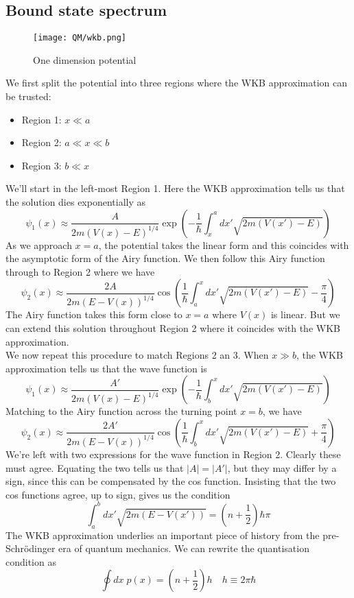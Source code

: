 \subsection{Bound state spectrum}
\begin{figure}[!h]
	\centering
	\texttt{[image: QM/wkb.png]}
	\caption{One dimension potential}
\end{figure}
\noindent
We first split the potential into three regions where the WKB approximation can be trusted:
\begin{itemize}
\item Region 1: $x \ll a$
\item Region 2: $a \ll x \ll b$
\item Region 3: $b \ll x$
\end{itemize}
We'll start in the left-most Region 1. Here the WKB
approximation tells us that the solution dies exponentially as
\[\psi_1(x) \approx \frac{A}{2m(V(x) - E)^{1/4}} \exp \left( -\frac{1}{\hbar} \int_{x}^a dx' \sqrt{2m(V(x')-E)} \right)\]
As we approach $x = a$, the potential takes the linear form and this coincides with the asymptotic form of the Airy function. We then follow this Airy function through to Region 2 where we have
\[\psi_2(x) \approx \frac{2A}{2m(E - V(x))^{1/4}} \cos \left( \frac{1}{\hbar} \int_{a}^x dx' \sqrt{2m(V(x')-E)} - \frac{\pi}{4} \right)\]
The Airy function takes this form close to $x = a$ where $V(x)$ is linear. But we can extend this solution throughout Region 2 where it coincides with the WKB approximation.
\\
We now repeat this procedure to match Regions 2 an 3. When $x \gg b$, the WKB approximation tells us that the wave function is
\[\psi_1(x) \approx \frac{A'}{2m(V(x) - E)^{1/4}} \exp \left( -\frac{1}{\hbar} \int_{b}^x dx' \sqrt{2m(V(x')-E)} \right)\]
Matching to the Airy function across the turning point $x = b$, we have
\[\psi_2(x) \approx \frac{2A'}{2m(E - V(x))^{1/4}} \cos \left( \frac{1}{\hbar} \int_{b}^x dx' \sqrt{2m(V(x')-E)} + \frac{\pi}{4} \right)\]
We're left with two expressions for the wave function in Region 2.
Clearly these must agree. Equating the two tells us that $|A| = |A'|$, but they may differ by a sign, since this can be compensated by the cos function. Insisting that the two cos functions agree, up to sign, gives us the condition
\[\int_a^b dx' \sqrt{2m(E-V(x'))} = \left( n + \frac{1}{2} \right) \hbar \pi\]
The WKB approximation underlies an important piece of history from the pre-Schrödinger era of quantum mechanics. 
We can rewrite the quantisation condition as
\[\oint dx \; p(x) = \left( n + \frac{1}{2} \right) h \quad h \equiv 2\pi \hbar \]

